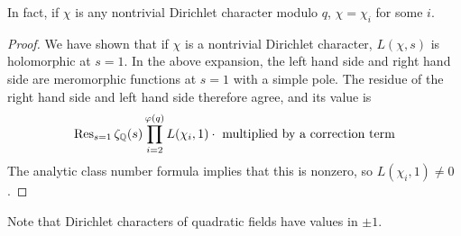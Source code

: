 In fact, if \( \chi \) is any nontrivial Dirichlet character modulo \( q \), \( \chi = \chi_i \) for some \( i \).
\begin{proof}
    We have shown that if \( \chi \) is a nontrivial Dirichlet character, \( L(\chi, s) \) is holomorphic at \( s = 1 \).
    In the above expansion, the left hand side and right hand side are meromorphic functions at \( s = 1 \) with a simple pole.
    The residue of the right hand side and left hand side therefore agree, and its value is
    \[ \Res_{s = 1}\zeta_{\mathbb Q}(s) \prod_{i=2}^{\varphi(q)}L(\chi_i, 1) \cdot \text{ multiplied by a correction term} \]
    The analytic class number formula implies that this is nonzero, so \( L(\chi_i, 1) \neq 0 \).
\end{proof}
Note that Dirichlet characters of quadratic fields have values in \( \pm 1 \).

